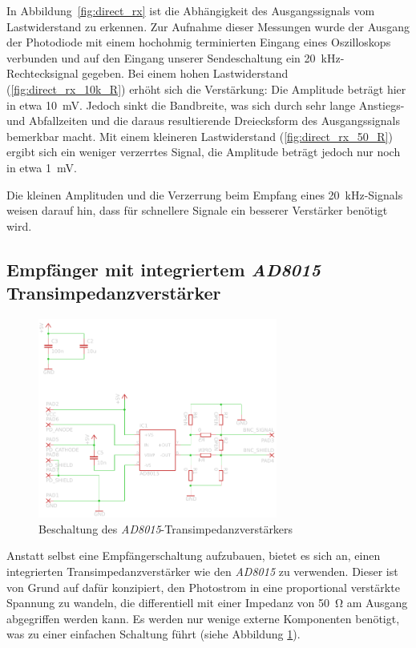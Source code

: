 \documentclass[12pt,a4paper]{article}
\begin{document}
In Abbildung~\ref{fig:direct_rx} ist die Abhängigkeit des Ausgangssignals vom Lastwiderstand zu erkennen. Zur Aufnahme dieser Messungen wurde der Ausgang der Photodiode mit einem hochohmig terminierten Eingang eines Oszilloskops verbunden und auf den Eingang unserer Sendeschaltung ein \SI{20}{\kilo\hertz}-Rechtecksignal gegeben. Bei einem hohen Lastwiderstand (\ref{fig:direct_rx_10k_R}) erhöht sich die Verstärkung: Die Amplitude beträgt hier in etwa \SI{10}{\milli\volt}. Jedoch sinkt die Bandbreite, was sich durch sehr lange Anstiegs- und Abfallzeiten und die daraus resultierende Dreiecksform des Ausgangssignals bemerkbar macht. Mit einem kleineren Lastwiderstand (\ref{fig:direct_rx_50_R}) ergibt sich ein weniger verzerrtes Signal, die Amplitude beträgt jedoch nur noch in etwa \SI{1}{\milli\volt}.

Die kleinen Amplituden und die Verzerrung beim Empfang eines \SI{20}{\kilo\hertz}-Signals weisen darauf hin, dass für schnellere Signale ein besserer Verstärker benötigt wird.

\subsection{Empfänger mit integriertem \textit{AD8015} Transimpedanzverstärker}
\label{sec:direct_rx_tia}

\begin{figure}[H]
  \centering
    \includegraphics[width=0.7\textwidth]{img/receiver.pdf}
  \caption{Beschaltung des \textit{AD8015}-Transimpedanzverstärkers}
  \label{fig:receiver_sch}
\end{figure}

Anstatt selbst eine Empfängerschaltung aufzubauen, bietet es sich an, einen integrierten Transimpedanzverstärker wie den \textit{AD8015} zu verwenden. Dieser ist von Grund auf dafür konzipiert, den Photostrom in eine proportional verstärkte Spannung zu wandeln, die differentiell mit einer Impedanz von \SI{50}{\ohm} am Ausgang abgegriffen werden kann. Es werden nur wenige externe Komponenten benötigt, was zu einer einfachen Schaltung führt (siehe Abbildung \ref{fig:receiver_sch}).
\end{document}
